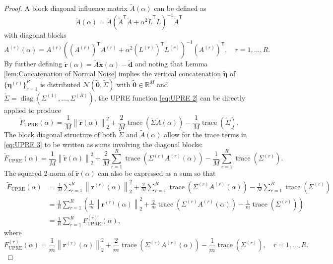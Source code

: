 \documentclass[12pt]{article}
\newcommand{\mA}{m}	%
\newcommand{\dVec}{\mathbf{d}}	%
\newcommand{\rVec}{\mathbf{r}}	%
\newcommand{\xVec}{\mathbf{x}}	%
\newcommand{\trans}[1]{{#1}^\mathsf{T}}	%
\DeclareMathOperator{\trace}{trace}		%
\DeclareMathOperator{\diag}{diag}	%
\newcommand{\regparam}{\alpha}  %
\newcommand{\rBig}{\widetilde{\rVec}}	%
\newcommand{\ABig}{\widetilde{A}}	%
\newcommand{\noise}{\eta}	%
\newcommand{\noiseVec}{\bm{\noise}}	%
\newcommand{\zeroVec}{\bm{0}}	%
\newcommand{\U}{F_{\text{UPRE}}}	%
\newcommand{\UBig}{\widetilde{F}_{\text{UPRE}}}	%
\begin{document}
\begin{proof}
A block diagonal influence matrix $\ABig(\regparam)$ can be defined as
\[\ABig(\regparam) = \ABig(\trans{\ABig}\ABig + \regparam^2\trans{\widetilde{L}}\widetilde{L})^{-1}\trans{\ABig}\]
with diagonal blocks
\begin{equation}
\label{eq:Diagonal blocks}
A^{(r)}(\regparam) = A^{(r)}\left(\trans{\left(A^{(r)}\right)}A^{(r)} + \regparam^2\trans{\left(L^{(r)}\right)}L^{(r)}\right)^{-1}\trans{\left(A^{(r)}\right)}, \quad r = 1,\ldots,R.
\end{equation}
By further defining $\rBig(\regparam) = \ABig\widetilde{\xVec}(\regparam) - \widetilde{\dVec}$ and noting that Lemma \ref{lem:Concatenation of Normal Noise} implies the vertical concatenation $\widetilde{\noiseVec}$ of $\{\noiseVec^{(r)}\}_{r=1}^R$ is distributed $\mathcal{N}(\widetilde{\zeroVec},\widetilde{\Sigma})$ with $\widetilde{\zeroVec} \in \mathbb{R}^M$ and $\widetilde{\Sigma} = \diag(\Sigma^{(1)},\ldots,\Sigma^{(R)})$, the UPRE function \eqref{eq:UPRE 2} can be directly applied to produce
\begin{equation}
\label{eq:UPRE 3}
\UBig(\regparam) = \frac{1}{M}\left\|\rBig(\regparam)\right\|_2^2 + \frac{2}{M}\trace\left(\widetilde{\Sigma}\ABig(\regparam)\right) - \frac{1}{M}\trace\left(\widetilde{\Sigma}\right).
\end{equation}
The block diagonal structure of both $\widetilde{\Sigma}$ and $\ABig(\regparam)$ allow for the trace terms in \eqref{eq:UPRE 3} to be written as sums involving the diagonal blocks:
\begin{equation}
\label{eq:UPRE 4}
\UBig(\regparam) = \frac{1}{M}\left\|\rBig(\regparam)\right\|_2^2 + \frac{2}{M} \sum_{r=1}^R \trace\left(\Sigma^{(r)}A^{(r)}(\regparam)\right) - \frac{1}{M} \sum_{r=1}^R \trace\left(\Sigma^{(r)}\right).
\end{equation}
The squared 2-norm of $\rBig(\regparam)$ can also be expressed as a sum so that
\begin{align*}
\UBig(\regparam) &= \frac{1}{M} \sum_{r=1}^R \left\|\rVec^{(r)}(\regparam)\right\|_2^2 + \frac{2}{M} \sum_{r=1}^R \trace\left(\Sigma^{(r)} A^{(r)}(\regparam)\right) - \frac{1}{M} \sum_{r=1}^R \trace\left(\Sigma^{(r)}\right) \\
&= \frac{1}{R} \sum_{r=1}^R \left(\frac{1}{\mA}\left\|\rVec^{(r)}(\regparam)\right\|_2^2 + \frac{2}{\mA} \trace\left(\Sigma^{(r)} A^{(r)}(\regparam)\right) - \frac{1}{\mA} \trace\left(\Sigma^{(r)}\right)\right) \\
&= \frac{1}{R} \sum_{r=1}^R \U^{(r)}(\regparam),
\end{align*}
where
\[\U^{(r)}(\regparam) = \frac{1}{\mA}\left\|\rVec^{(r)}(\regparam)\right\|_2^2 + \frac{2}{\mA} \trace\left(\Sigma^{(r)} A^{(r)}(\regparam)\right) - \frac{1}{\mA} \trace\left(\Sigma^{(r)}\right), \quad r = 1,\ldots,R.\]
\end{proof}
\end{document}
